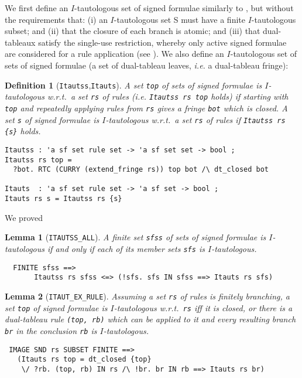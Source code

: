 \documentclass[a4paper]{article}
\newtheorem{lemma}{Lemma}
\newtheorem{definition}{Definition}
\newcommand{\ie}{\textit{i.e. }}
\begin{document}
We first define an $I$-tautologous set of signed formulae similarly to
\cite[Definition~7]{fitting-dual-tableau}, but without the
requirements that: (i) an $I$-tautologous set S must have a finite
$I$-tautologous subset; and (ii) that the closure of each branch is
atomic; and (iii) that dual-tableaux satisfy the single-use
restriction, whereby only active signed formulae are considered for a
rule application (see \cite[Definitions~1,4]{fitting-dual-tableau}).
We also define an $I$-tautologous set of sets of signed formulae (a set
of dual-tableau leaves, \ie a dual-tableau fringe):
\begin{definition}[\texttt{Itautss},\texttt{Itauts}]\label{Itauts-def}
\label{Itauts}
\label{Itautss}
A set \texttt{top} of sets of signed formulae is $I$-tautologous w.r.t.\
a set \texttt{rs} of rules (\ie \texttt{Itautss rs top} holds) if
starting with \texttt{top} and repeatedly applying rules from
\texttt{rs} gives
a fringe \texttt{bot} which is closed. A set \texttt{s} of signed
formulae is $I$-tautologous w.r.t.\ a set \texttt{rs} of rules if
\texttt{Itautss rs \{s\}} holds.
\begin{verbatim}
Itautss : 'a sf set rule set -> 'a sf set set -> bool ;
Itautss rs top = 
  ?bot. RTC (CURRY (extend_fringe rs)) top bot /\ dt_closed bot

Itauts  : 'a sf set rule set -> 'a sf set -> bool ;
Itauts rs s = Itautss rs {s} 
\end{verbatim}
\end{definition}

We proved
\begin{lemma}[\texttt{ITAUTSS\_ALL}] \label{ITAUTSS-ALL}
A finite set \texttt{sfss} of sets of signed formulae is $I$-tautologous
if and only if each of its member sets \texttt{sfs} is $I$-tautologous.
\begin{verbatim}
  FINITE sfss ==> 
       Itautss rs sfss <=> (!sfs. sfs IN sfss ==> Itauts rs sfs)
\end{verbatim}
\end{lemma}

\begin{lemma}[\texttt{ITAUT\_EX\_RULE}]\label{ITAUT-EX-RULE}
Assuming a set \texttt{rs} of rules is finitely branching,
a set \texttt{top} of signed formulae 
is $I$-tautologous w.r.t.\ \texttt{rs} iff it is closed, 
or there is a dual-tableau rule 
\texttt{(top, rb)}
which can be applied to it and
every resulting branch \texttt{br} in the conclusion 
\texttt{rb} is $I$-tautologous.
\begin{verbatim}
 IMAGE SND rs SUBSET FINITE ==> 
   (Itauts rs top = dt_closed {top} 
    \/ ?rb. (top, rb) IN rs /\ !br. br IN rb ==> Itauts rs br)
\end{verbatim}
\end{lemma}
\end{document}
